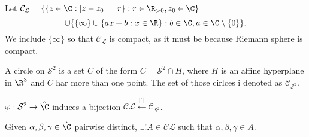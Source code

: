 \begin{definition}
  Let $\mathcal{C}_{\mathcal{L}}= \{ \{z\in \C : |z-z_0|=r \}: r\in \R_{>0} , z_0\in \C \}$
    $$\cup \{\{ \infty \}\cup \{ ax+b: x\in \R \}: b\in \C, a\in \C\setminus\{0\}\}.$$
  We include $\{\infty\}$ so that $\mathcal{C}_{\mathcal{L}}$ is compact, as it must be because Riemann sphere is compact.
\end{definition}

\begin{definition}
  A circle on $\mathcal{S}^2$ is a set $C$ of the form $C=\mathcal{S}^2\cap H$, where $H$ is an affine hyperplane in $\R^3$ and $C$ har more than one point. The set of those cirlces i denoted as $\mathcal{C}_{\mathcal{S}^2}$.
\end{definition}

\begin{remark}
  $\varphi : \mathcal{S}^2\to \hat{\C}$ induces a bijection $\mathcal{C}\mathcal{L}\xleftarrow{|:|}\mathcal{C}_{\mathcal{S}^2}$.
\end{remark}

\begin{note}
  Given $\alpha, \beta, \gamma \in \hat{\C}$ pairwise distinct, $\exists ! A\in \mathcal{C}\mathcal{L}$ such that $\alpha,\beta,\gamma \in A$.
\end{note}

